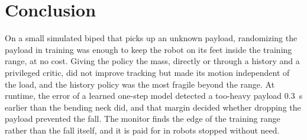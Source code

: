 \documentclass[conference]{IEEEtran}
\begin{document}
\section{Conclusion}

On a small simulated biped that picks up an unknown payload, randomizing the payload in training was enough to keep the robot on its feet inside the training range, at no cost.
Giving the policy the mass, directly or through a history and a privileged critic, did not improve tracking but made its motion independent of the load, and the history policy was the most fragile beyond the range.
At runtime, the error of a learned one-step model detected a too-heavy payload \SI{0.3}{s} earlier than the bending neck did, and that margin decided whether dropping the payload prevented the fall.
The monitor finds the edge of the training range rather than the fall itself, and it is paid for in robots stopped without need.



\end{document}
